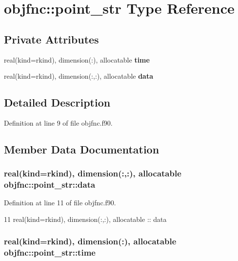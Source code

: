 \section{objfnc\+:\+:point\+\_\+str Type Reference}
\label{structobjfnc_1_1point__str}
\subsection*{Private Attributes}
\begin{DoxyCompactItemize}
\item 
real(kind=rkind), dimension(\+:), allocatable {\bf time}
\item 
real(kind=rkind), dimension(\+:,\+:), allocatable {\bf data}
\end{DoxyCompactItemize}


\subsection{Detailed Description}


Definition at line 9 of file objfnc.\+f90.



\subsection{Member Data Documentation}
\subsubsection[{data}]{\setlength{\rightskip}{0pt plus 5cm}real(kind=rkind), dimension(\+:,\+:), allocatable objfnc\+::point\+\_\+str\+::data\hspace{0.3cm}{\ttfamily [private]}}\label{structobjfnc_1_1point__str_ae285880031039d0c4823e3c60d1216bf}


Definition at line 11 of file objfnc.\+f90.


\begin{DoxyCode}
11     \textcolor{keywordtype}{real(kind=rkind)}, \textcolor{keywordtype}{dimension(:,:)}, \textcolor{keywordtype}{allocatable} :: data
\end{DoxyCode}
\subsubsection[{time}]{\setlength{\rightskip}{0pt plus 5cm}real(kind=rkind), dimension(\+:), allocatable objfnc\+::point\+\_\+str\+::time\hspace{0.3cm}{\ttfamily [private]}}\label{structobjfnc_1_1point__str_a591a50f288c4537afefe8f1869db5a7e}


